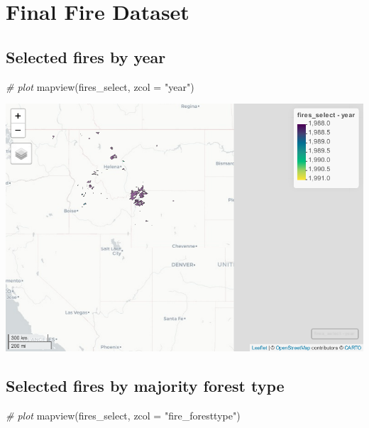 \documentclass[
]{book}
\newenvironment{Shaded}{\begin{snugshade}}{\end{snugshade}}
\newcommand{\AttributeTok}[1]{\textcolor[rgb]{0.77,0.63,0.00}{#1}}
\newcommand{\CommentTok}[1]{\textcolor[rgb]{0.56,0.35,0.01}{\textit{#1}}}
\newcommand{\FunctionTok}[1]{\textcolor[rgb]{0.00,0.00,0.00}{#1}}
\newcommand{\NormalTok}[1]{#1}
\newcommand{\StringTok}[1]{\textcolor[rgb]{0.31,0.60,0.02}{#1}}
\begin{document}
\hypertarget{final-fire-dataset}{%
\section{Final Fire Dataset}\label{final-fire-dataset}}

\hypertarget{selected-fires-by-year}{%
\subsection{Selected fires by year}\label{selected-fires-by-year}}

\begin{Shaded}
\begin{Highlighting}[]
\CommentTok{\# plot}
\FunctionTok{mapview}\NormalTok{(fires\_select, }\AttributeTok{zcol =} \StringTok{"year"}\NormalTok{)}
\end{Highlighting}
\end{Shaded}

\includegraphics{_main_files/figure-latex/plot year-1.pdf}

\hypertarget{selected-fires-by-majority-forest-type}{%
\subsection{Selected fires by majority forest type}\label{selected-fires-by-majority-forest-type}}

\begin{Shaded}
\begin{Highlighting}[]
\CommentTok{\# plot}
\FunctionTok{mapview}\NormalTok{(fires\_select, }\AttributeTok{zcol =} \StringTok{"fire\_foresttype"}\NormalTok{)}
\end{Highlighting}
\end{Shaded}
\end{document}
